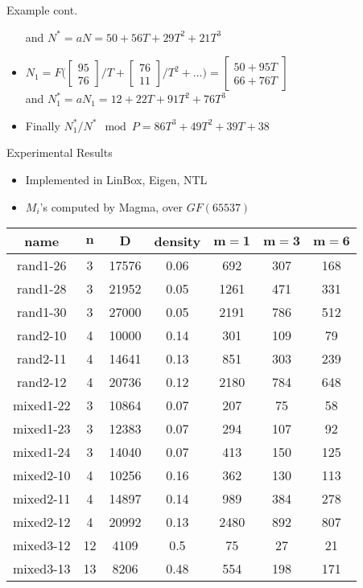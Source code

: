 \documentclass{beamer}
\begin{document}
\begin{frame}{Example cont.}
\begin{itemize}
		 and $N^* = aN = 50 + 56T + 29T^2 + 21T^3$
		 \pause
		 \item $N_1 = F\bigg(
		 \begin{bmatrix}
		 95\\76
		 \end{bmatrix}/T+
		 \begin{bmatrix}
		 76\\11
		 \end{bmatrix}/T^2 + \dots
		 \bigg) = 
		 \begin{bmatrix}
		 50 + 95T\\
		 66 + 76T
		 \end{bmatrix}$ \\
		 and $N_1^* = aN_1 = 12 + 22T + 91T^2 + 76T^3$
		 \pause
		 \item Finally $N_1^* / N^* \mod P = 86T^3 + 49T^2 + 39T + 38$
	\end{itemize}
\end{frame}

\begin{frame}{Experimental Results}
	\begin{itemize}
		\item Implemented in LinBox, Eigen, NTL
		\item $M_i$'s computed by Magma, over $GF(65537)$
	\end{itemize}
	\begin{center}
		\begin{tabular}{c|c|c|c|c|c|c}
			\textbf{name}& $\bm{n}$ & $\bm{D}$ & \textbf{density} & $\bm{m = 1}$ & $\bm{m = 3}$ & $\bm{m = 6}$ \\
			\hline
			rand1-26&3 &17576&0.06& 692 & 307& 168  \\
			rand1-28&3 &21952&0.05&1261 & 471 & 331   \\
			rand1-30&3 &27000&0.05&2191 & 786 & 512   \\
			rand2-10&4 &10000&0.14&301  & 109 & 79    \\
			rand2-11&4 &14641&0.13&851  & 303 & 239  \\
			rand2-12&4&20736&0.12&2180  & 784 & 648   \\
			mixed1-22&3 &10864&0.07&207 & 75 & 58   \\
			mixed1-23&3 &12383&0.07&294 & 107 & 92   \\
			mixed1-24&3 &14040&0.07&413 & 150 & 125  \\
			mixed2-10&4 &10256&0.16&362 & 130 & 113 \\
			mixed2-11&4 &14897&0.14&989 & 384 & 278 \\
			mixed2-12&4 &20992&0.13&2480& 892 & 807 \\
			mixed3-12&12 &4109&0.5&75   & 27 & 21   \\
			mixed3-13&13&8206&0.48&554  & 198 & 171
		\end{tabular}
	\end{center}
\end{frame}
\end{document}
